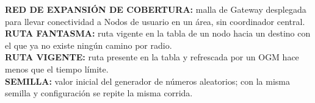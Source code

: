 \textbf{RED DE EXPANSIÓN DE COBERTURA:} malla de Gateway desplegada para llevar conectividad a Nodos de usuario en un área, sin coordinador central.\\

\textbf{RUTA FANTASMA:} ruta vigente en la tabla de un nodo hacia un destino con el que ya no existe ningún camino por radio.\\

\textbf{RUTA VIGENTE:} ruta presente en la tabla y refrescada por un OGM hace menos que el tiempo límite.\\

\textbf{SEMILLA:} valor inicial del generador de números aleatorios; con la misma semilla y configuración se repite la misma corrida.
